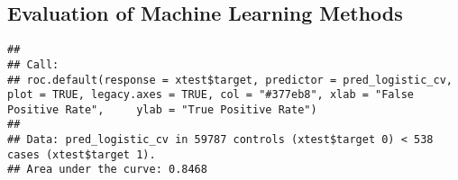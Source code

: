 \documentclass[]{article}
\newenvironment{Shaded}{\begin{snugshade}}{\end{snugshade}}
\newcommand{\KeywordTok}[1]{\textcolor[rgb]{0.13,0.29,0.53}{\textbf{#1}}}
\newcommand{\DataTypeTok}[1]{\textcolor[rgb]{0.13,0.29,0.53}{#1}}
\newcommand{\StringTok}[1]{\textcolor[rgb]{0.31,0.60,0.02}{#1}}
\newcommand{\CommentTok}[1]{\textcolor[rgb]{0.56,0.35,0.01}{\textit{#1}}}
\newcommand{\OtherTok}[1]{\textcolor[rgb]{0.56,0.35,0.01}{#1}}
\newcommand{\OperatorTok}[1]{\textcolor[rgb]{0.81,0.36,0.00}{\textbf{#1}}}
\newcommand{\NormalTok}[1]{#1}
\begin{document}
\subsection{Evaluation of Machine Learning
Methods}\label{evaluation-of-machine-learning-methods}

\begin{Shaded}
\end{Shaded}

\begin{verbatim}
## 
## Call:
## roc.default(response = xtest$target, predictor = pred_logistic_cv,     plot = TRUE, legacy.axes = TRUE, col = "#377eb8", xlab = "False Positive Rate",     ylab = "True Positive Rate")
## 
## Data: pred_logistic_cv in 59787 controls (xtest$target 0) < 538 cases (xtest$target 1).
## Area under the curve: 0.8468
\end{verbatim}
\end{document}
